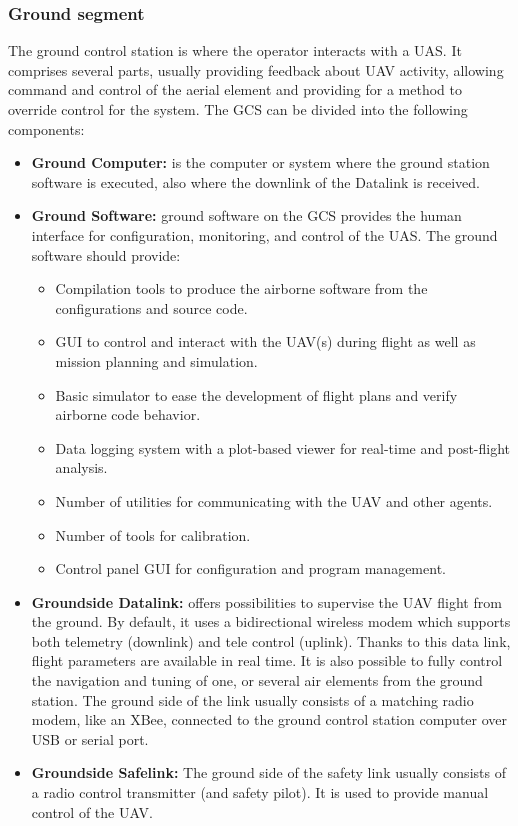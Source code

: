\subsubsection{Ground segment} 
The ground control station is where the operator interacts with a UAS. It comprises several parts, usually providing feedback about UAV activity, allowing command and control of the aerial element and providing for a method to override control for the system.
The GCS can be divided into the following components:
\begin{itemize}
    \item \textbf{Ground Computer:} is the computer or system where the ground station software is executed, also where the downlink of the Datalink is received.
    \item \textbf{Ground Software:}  ground software on the GCS provides the human interface for configuration, monitoring, and control of the UAS. The ground software should provide:
    \begin{itemize}
        \item Compilation tools to produce the airborne software from the configurations and source code.
        \item GUI to control and interact with the UAV(s) during flight as well as mission planning and simulation.
        \item Basic simulator to ease the development of flight plans and verify airborne code behavior.
        \item Data logging system with a plot-based viewer for real-time and post-flight analysis.
        \item Number of utilities for communicating with the UAV and other agents.
        \item Number of tools for calibration.
        \item Control panel GUI for configuration and program management.
    \end{itemize}
    \item \textbf{Groundside Datalink:} offers possibilities to supervise the UAV flight from the ground. By default, it uses a bidirectional wireless modem which supports both telemetry (downlink) and tele control (uplink). Thanks to this data link, flight parameters are available in real time. It is also possible to fully control the navigation and tuning of one, or several air elements from the ground station. The ground side of the link usually consists of a matching radio modem, like an XBee, connected to the ground control station computer over USB or serial port.
    \item \textbf{Groundside Safelink:} The ground side of the safety link usually consists of a radio control transmitter (and safety pilot). It is used to provide manual control of the UAV.
\end{itemize}
